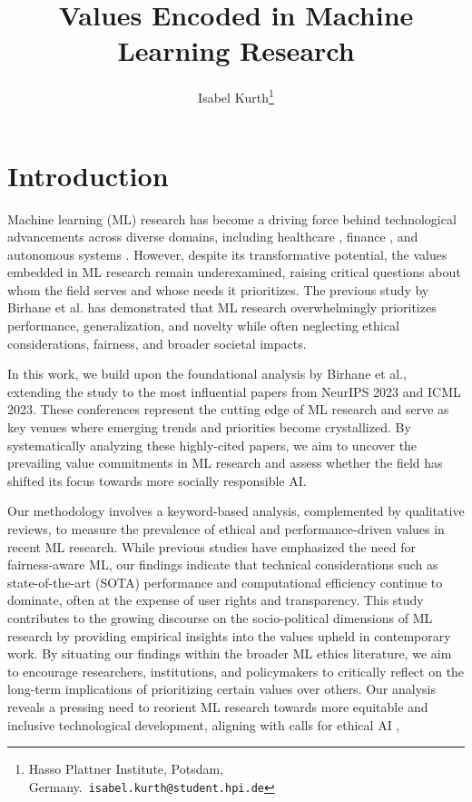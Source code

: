 \documentclass{article}
\title{Values Encoded in Machine Learning Research}
\author{Isabel Kurth\thanks{Hasso Plattner Institute, Potsdam, Germany.\ \texttt{isabel.kurth@student.hpi.de}}}
\begin{document}
\maketitle
\thispagestyle{plain}

\begin{abstract}
\end{abstract}

\section{Introduction}
Machine learning (ML) research has become a driving force behind technological advancements across diverse domains, including healthcare \cite{esteva2019guide}, finance \cite{berg2022fintech}, and autonomous systems \cite{hawkins2021guidance}. 
However, despite its transformative potential, the values embedded in ML research remain underexamined, 
raising critical questions about whom the field serves and whose needs it prioritizes. The previous study by Birhane et al. \cite{valuesInML2021} has demonstrated that ML research overwhelmingly prioritizes 
performance, generalization, and novelty while often neglecting ethical considerations, fairness, and broader societal impacts.

In this work, we build upon the foundational analysis by Birhane et al., extending the study to the most influential papers from NeurIPS 2023 and ICML 2023. 
These conferences represent the cutting edge of ML research and serve as key venues where emerging trends and priorities become crystallized. By systematically analyzing these highly-cited papers, 
we aim to uncover the prevailing value commitments in ML research and assess whether the field has shifted its focus towards more socially responsible AI.

Our methodology involves a keyword-based analysis, complemented by qualitative reviews, to measure the prevalence of ethical and performance-driven values in recent ML research. While previous studies \cite{geyik2019fairness} 
have emphasized the need for fairness-aware ML, our findings indicate that technical considerations such as state-of-the-art (SOTA) performance and computational
efficiency continue to dominate, often at the expense of user rights and transparency.
This study contributes to the growing discourse on the socio-political dimensions of ML research by providing empirical insights into the values upheld in contemporary work. By situating our findings within 
the broader ML ethics literature, we aim to encourage researchers, institutions, and policymakers to critically reflect on the long-term implications of prioritizing 
certain values over others. Our analysis reveals a pressing need to reorient ML research towards more equitable and inclusive technological development, aligning with calls for ethical AI \cite{floridi2022unified}, \cite{kalluri2020don}
\end{document}
